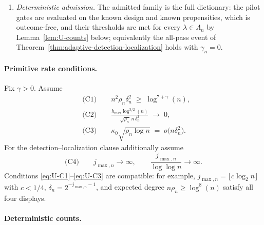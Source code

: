 \documentclass[11pt]{article}
\theoremstyle{definition}
\newcommand{\1}{\mathbf 1}\newcommand{\op}{\operatorname}
\begin{document}
\begin{enumerate}[label=(S\arabic*),leftmargin=2.4em,itemsep=2pt]
mean zero, $\|f_0\|_\infty\le B$; single-atom alternatives replace $f_0$ by
$f_0+\varsigma a h\Psi_\lambda^S$ with $\|f_0+\varsigma ah\Psi_\lambda^S\|_\infty
\le B$, $\lambda\in\Lambda_n$.  Sparsity: $\rho_n=\sigma(\alpha_n)\to0$.  Then
every edge probability lies in $[c_\rho\rho_n,C_\rho\rho_n]$ with
$c_\rho=e^{-B}/2$ and $C_\rho=2e^{B}$ for all large $n$.
\item\label{S:gates} \emph{Deterministic admission.}  The admitted family is the
full dictionary: the pilot gates are evaluated on the known design and known
propensities, which is outcome-free, and their thresholds are met for every
$\lambda\in\Lambda_n$ by Lemma~\ref{lem:U-counts} below; equivalently the
all-pass event of Theorem~\ref{thm:adaptive-detection-localization} holds with
$\gamma_n=0$.
\end{enumerate}

\paragraph{Primitive rate conditions.}
Fix $\gamma>0$.  Assume
\begin{align}
&\text{(C1)}\qquad
n^2\rho_n\delta_n^2\;\ge\;\log^{7+\gamma}(n),
\label{eq:U-C1}\\
&\text{(C2)}\qquad
\frac{h_{\max}\log^{3/2}(n)}{\sqrt{\rho_n}\,n\,\delta_n^{2}}
\;\longrightarrow\;0,
\label{eq:U-C2}\\
&\text{(C3)}\qquad
\kappa_0\sqrt{\rho_n\log n}\;=\;o\bigl(n\delta_n^{2}\bigr).
\label{eq:U-C3}
\end{align}
For the detection--localization clause additionally assume
\begin{equation}
\text{(C4)}\qquad
j_{\max,n}\to\infty,
\qquad
\frac{j_{\max,n}}{\log\log n}\to\infty.
\label{eq:U-C4}
\end{equation}
Conditions \eqref{eq:U-C1}--\eqref{eq:U-C3} are compatible: for example,
$j_{\max,n}=\lfloor c\log_2n\rfloor$ with $c<1/4$, $\delta_n=2^{-j_{\max,n}-1}$,
and expected degree $n\rho_n\ge\log^{8}(n)$ satisfy all four displays.

\paragraph{Deterministic counts.}
\end{document}
